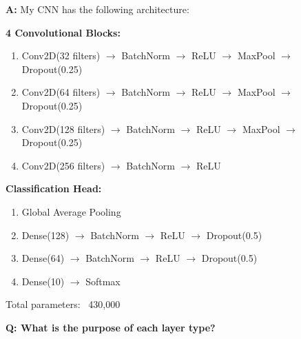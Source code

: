 \documentclass[a4paper,12pt]{article}
\newcommand{\vivaQ}[1]{\textcolor{questioncolor}{\textbf{Q: #1}}}
\newcommand{\vivaA}[1]{\textcolor{answercolor}{\textbf{A:}} #1}
\begin{document}
\vivaA{My CNN has the following architecture:

\textbf{4 Convolutional Blocks:}
\begin{enumerate}
    \item Conv2D(32 filters) $\rightarrow$ BatchNorm $\rightarrow$ ReLU $\rightarrow$ MaxPool $\rightarrow$ Dropout(0.25)
    \item Conv2D(64 filters) $\rightarrow$ BatchNorm $\rightarrow$ ReLU $\rightarrow$ MaxPool $\rightarrow$ Dropout(0.25)
    \item Conv2D(128 filters) $\rightarrow$ BatchNorm $\rightarrow$ ReLU $\rightarrow$ MaxPool $\rightarrow$ Dropout(0.25)
    \item Conv2D(256 filters) $\rightarrow$ BatchNorm $\rightarrow$ ReLU
\end{enumerate}

\textbf{Classification Head:}
\begin{enumerate}
    \item Global Average Pooling
    \item Dense(128) $\rightarrow$ BatchNorm $\rightarrow$ ReLU $\rightarrow$ Dropout(0.5)
    \item Dense(64) $\rightarrow$ BatchNorm $\rightarrow$ ReLU $\rightarrow$ Dropout(0.5)
    \item Dense(10) $\rightarrow$ Softmax
\end{enumerate}

Total parameters: ~430,000}

\vspace{0.5cm}

\vivaQ{What is the purpose of each layer type?}
\end{document}

